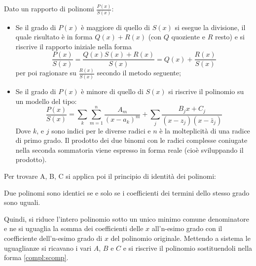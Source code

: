 Dato un rapporto di polinomi $\frac{P(x)}{S(x)}$:
\begin{itemize}
	\item Se il grado di $P(x)$ è maggiore di quello di $S(x)$ si esegue la divisione, il quale risultato è in forma $Q(x)+R(x)$ (con $Q$ quoziente e $R$ resto) e si riscrive il rapporto iniziale nella forma
	      \[
		      \dfrac{P(x)}{S(x)}=\dfrac{Q(x)S(x)+R(x)}{S(x)}=Q(x)+\dfrac{R(x)}{S(x)}
	      \]
	      per poi ragionare su $\frac{R(x)}{S(x)}$ secondo il metodo seguente;
	\item Se il grado di $P(x)$ è minore di quello di $S(x)$ si riscrive il polinomio su un modello del tipo:
	      \begin{equation}
		      \label{compl:scomp}
		      \frac{P(x)}{S(x)}=\sum_k\sum_{m=1}^n \frac{A_m}{(x-a_k)^m}+\sum_j \frac{B_jx+C_j}{(x-z_j)(x-\bar z_j)}
	      \end{equation}
	      Dove $k$, e $j$ sono indici per le diverse radici e $n$ è la molteplicità di una radice di primo grado. Il prodotto dei due binomi con le radici complesse coniugate nella seconda sommatoria viene espresso in forma reale (cioè sviluppando il prodotto).
\end{itemize}
Per trovare A, B, C si applica poi il principio di identità dei polinomi:
\begin{enunc}
	Due polinomi sono identici se e solo se i coefficienti dei termini dello stesso grado sono uguali.
\end{enunc}
Quindi, si riduce l'intero polinomio sotto un unico minimo comune denominatore e ne si uguaglia la somma dei coefficienti delle $x$ all'n-esimo grado con il coefficiente dell'n-esimo grado di $x$ del polinomio originale. Mettendo a sistema le uguaglianze si ricavano i vari $A$, $B$ e $C$ e si riscrive il polinomio sostituendoli nella forma \ref{compl:scomp}.
